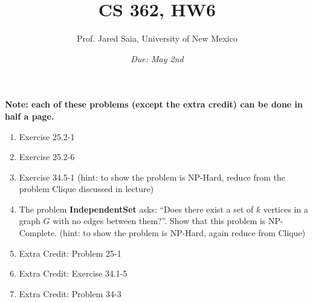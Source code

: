 \documentclass[11pt]{article}
\begin{document}
\title{CS 362, HW6}

\author {Prof. Jared Saia, University of New Mexico}

\date{\emph{Due: May 2nd}}
\maketitle

{\bf Note: each of these problems (except the extra credit) can be done
in half a page.}

\begin{enumerate}
\item Exercise 25.2-1
\item Exercise 25.2-6
\item Exercise 34.5-1 (hint: to show the problem is NP-Hard, reduce
from the problem Clique discussed in lecture)
\item The problem \textbf{IndependentSet} asks: ``Does there exist a
set of $k$ vertices in a graph $G$ with no edges between them?''.
Show that this problem is NP-Complete. (hint: to show the problem is
NP-Hard, again reduce from Clique)
\item Extra Credit: Problem 25-1
\item Extra Credit: Exercise 34.1-5
\item Extra Credit: Problem 34-3
\end{enumerate}
\end{document}
